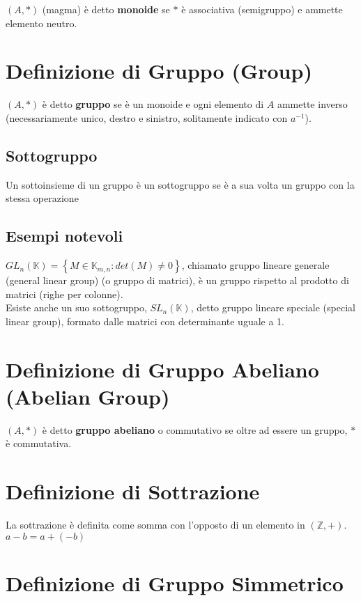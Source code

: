 \documentclass[a4paper, twoside, italian, 11pt]{book}
\newcommand{\braces}[1] {\left\{#1\right\}}
\newcommand{\Z}{\mathbb{Z}}
\newcommand{\K}{\mathbb{K}}
\begin{document}
$(A, *)$ (magma) è detto \textbf{monoide} se $*$ è associativa (semigruppo) e ammette elemento neutro.


\section{Definizione di Gruppo (Group)}

$(A, *)$ è detto \textbf{gruppo} se è un monoide e ogni elemento di $A$ ammette inverso (necessariamente unico, destro e sinistro, solitamente indicato con $a^{-1}$).


\subsection{Sottogruppo}

Un sottoinsieme di un gruppo è un sottogruppo se è a sua volta un gruppo con la stessa operazione


\subsection{Esempi notevoli}

$GL_n(\K) = \braces{M \in \K_{m,n} : det(M) \neq 0}$, chiamato gruppo lineare generale (general linear group) (o gruppo di matrici), è un gruppo rispetto al prodotto di matrici (righe per colonne). \\

\noindent
Esiste anche un suo sottogruppo, $SL_n(\K)$, detto gruppo lineare speciale (special linear group), formato dalle matrici con determinante uguale a 1.


\section{Definizione di Gruppo Abeliano (Abelian Group)}

$(A, *)$ è detto \textbf{gruppo abeliano} o commutativo se oltre ad essere un gruppo, $*$ è commutativa.


\section{Definizione di Sottrazione}

La sottrazione è definita come somma con l'opposto di un elemento in $(\Z, +)$. \\

$a - b = a + (-b)$


\section{Definizione di Gruppo Simmetrico}
\end{document}
